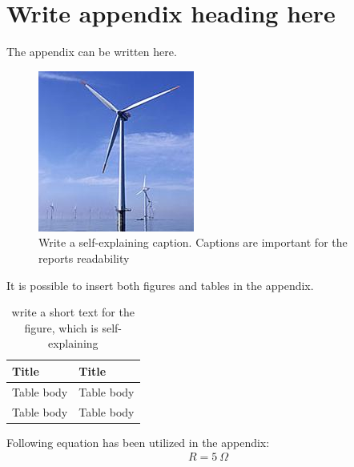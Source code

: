 \chapter{Write appendix heading here}
The appendix can be written here.

\begin{figure}[h]
	\centering
	\includegraphics[scale=1]{figures/windmill.png}
	\caption{Write a self-explaining caption. Captions are important for the reports readability}
\end{figure}

It is possible to insert both figures and tables in the appendix.

\begin{table}[h]
\centering
\caption{write a short text for the figure, which is self-explaining}
\begin{tabular}{|l|l|}
\hline
\textbf{Title} & \textbf{Title} \\ \hline
Table body     & Table body     \\ \hline
Table body     & Table body     \\ \hline
\end{tabular}
\end{table}

Following equation has been utilized in the appendix:
\begin{align}
R=5~\Omega
\end{align}